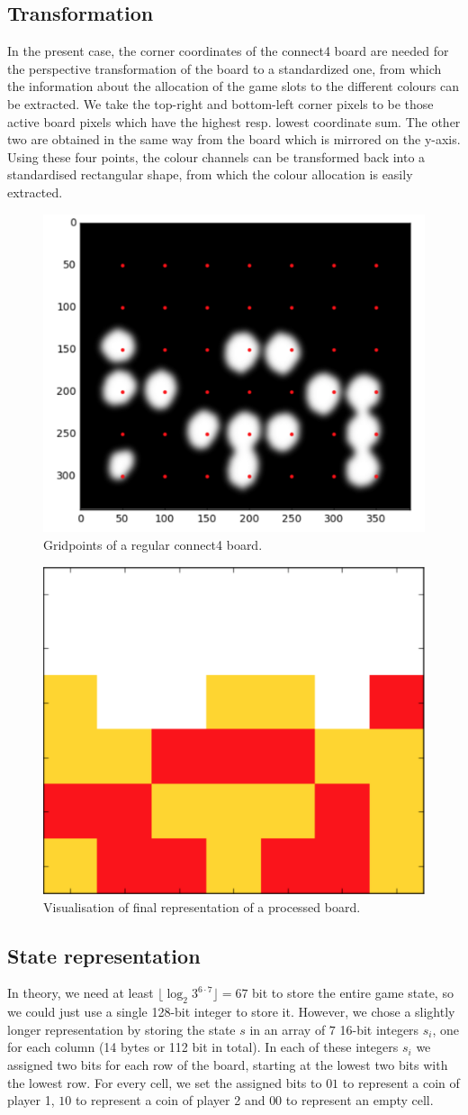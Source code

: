 \documentclass[10pt,twocolumn,letterpaper]{article}
\begin{document}
\subsection{Transformation}
In the present case, the corner coordinates of the connect4 board are needed for the perspective transformation of the board to a standardized one, from which the information about the allocation of the game slots to the different colours can be extracted.
We take the top-right and bottom-left corner pixels to be those active board pixels which have the highest resp. lowest coordinate sum. The other two are obtained in the same way from the board which is mirrored on the y-axis.
Using these four points, the colour channels can be transformed back into a standardised rectangular shape, from which the colour allocation is easily extracted.
\begin{figure}[bh]
  \centering
  \includegraphics[width = .3\textwidth]{figures/grid.png}
  \caption{Gridpoints of a regular connect4 board.}
  \label{fig:grid}
\end{figure}
\begin{figure}[bh]
  \centering
  \includegraphics[width = .3\textwidth]{figures/finalBoard.png}
  \caption{Visualisation of final representation of a processed board.}
  \label{fig:final}
\end{figure}



\subsection{State representation}
In theory, we need at least $\lfloor \log_2 3^{6\cdot 7} \rfloor = 67$ bit to store the entire game state, so we could just use a single 128-bit integer to store it.
However, we chose a slightly longer representation by storing the state $s$ in an array of $7$ 16-bit integers $s_i$, one for each column (14 bytes or 112 bit in total).
In each of these integers $s_i$ we assigned two bits for each row of the board, starting at the lowest two bits with the lowest row.
For every cell, we set the assigned bits to $01$ to represent a coin of player 1, $10$ to represent a coin of player 2 and $00$ to represent an empty cell.
\end{document}
